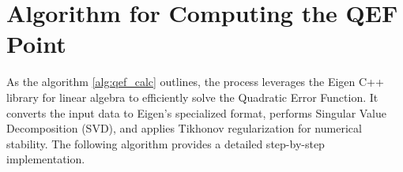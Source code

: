 


\section{Algorithm for Computing the QEF Point}

As the algorithm \ref{alg:qef_calc} outlines, the process leverages the Eigen C++ library for linear algebra to efficiently solve the Quadratic Error Function. It converts the input data to Eigen's specialized format, performs Singular Value Decomposition (SVD), and applies Tikhonov regularization for numerical stability. The following algorithm provides a detailed step-by-step implementation.

